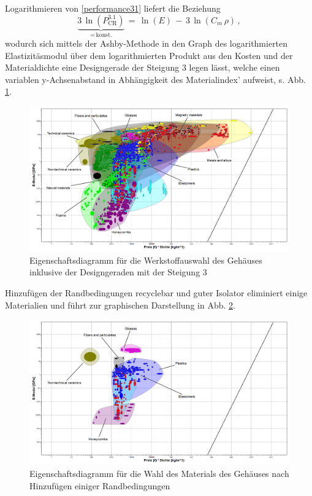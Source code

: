 Logarithmieren von \ref{performance31} liefert die Beziehung
\begin{equation}
\underbrace{3\,\ln(P_{\text{CR}}^{3.1})}_{=\,\text{konst.}}\,=\,\ln(E)\,-\,3\,\ln(C_m\,\rho)\,,
\end{equation}
wodurch sich mittels der Ashby-Methode in den Graph des logarithmierten Elastizitäsmodul über dem logarithmierten Produkt aus den Kosten und der Materialdichte eine Designgerade der Steigung 3 legen lässt, welche einen variablen y-Achsenabstand in Abhängigkeit des Materialindex' aufweist, s. Abb. \ref{fig:ces_3_1_1}.\\
\begin{figure}[H]
	\centering
	\includegraphics[width=1.0\linewidth]{chapter/Bilder/3_1_1}
	\caption{Eigenschaftsdiagramm für die Werkstoffauswahl des Gehäuses inklusive der Designgeraden mit der Steigung 3}
		\label{fig:ces_3_1_1}
\end{figure}
Hinzufügen der Randbedingungen \glqq recyclebar\grqq{} und \glqq guter Isolator\grqq{} eliminiert einige Materialien und führt zur graphischen Darstellung in Abb. \ref{fig:ces_3_1_2}.\\
\begin{figure}[H]
	\centering
	\includegraphics[width=1.0\linewidth]{chapter/Bilder/3_1_2}
	\caption{Eigenschaftsdiagramm für die Wahl des Materials des Gehäuses nach Hinzufügen einiger Randbedingungen}
	\label{fig:ces_3_1_2}
\end{figure}
